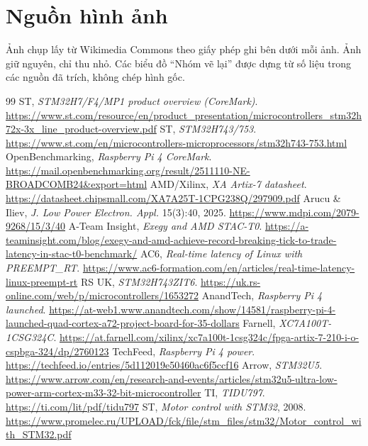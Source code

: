 \documentclass[11pt,a4paper]{article}
\begin{document}
\section*{Nguồn hình ảnh}
\small Ảnh chụp lấy từ Wikimedia Commons theo giấy phép ghi bên dưới mỗi ảnh. Ảnh giữ nguyên, chỉ thu nhỏ. Các biểu đồ ``Nhóm vẽ lại'' được dựng từ số liệu trong các nguồn đã trích, không chép hình gốc.
\begin{itemize}\footnotesize
\creditList
\end{itemize}

\begin{thebibliography}{99}\small
{} ST, \emph{STM32H7/F4/MP1 product overview (CoreMark)}. \url{https://www.st.com/resource/en/product_presentation/microcontrollers_stm32h72x-3x_line_product-overview.pdf}
 ST, \emph{STM32H743/753}. \url{https://www.st.com/en/microcontrollers-microprocessors/stm32h743-753.html}
 OpenBenchmarking, \emph{Raspberry Pi 4 CoreMark}. \url{https://mail.openbenchmarking.org/result/2511110-NE-BROADCOMB24&export=html}
 AMD/Xilinx, \emph{XA Artix-7 datasheet}. \url{https://datasheet.chipsmall.com/XA7A25T-1CPG238Q/297909.pdf}
 Arucu \& Iliev, \emph{J. Low Power Electron. Appl.} 15(3):40, 2025. \url{https://www.mdpi.com/2079-9268/15/3/40}
 A-Team Insight, \emph{Exegy and AMD STAC-T0}. \url{https://a-teaminsight.com/blog/exegy-and-amd-achieve-record-breaking-tick-to-trade-latency-in-stac-t0-benchmark/}
 AC6, \emph{Real-time latency of Linux with PREEMPT\_RT}. \url{https://www.ac6-formation.com/en/articles/real-time-latency-linux-preempt-rt}
 RS UK, \emph{STM32H743ZIT6}. \url{https://uk.rs-online.com/web/p/microcontrollers/1653272}
 AnandTech, \emph{Raspberry Pi 4 launched}. \url{https://at-web1.www.anandtech.com/show/14581/raspberry-pi-4-launched-quad-cortex-a72-project-board-for-35-dollars}
 Farnell, \emph{XC7A100T-1CSG324C}. \url{https://at.farnell.com/xilinx/xc7a100t-1csg324c/fpga-artix-7-210-i-o-cspbga-324/dp/2760123}
 TechFeed, \emph{Raspberry Pi 4 power}. \url{https://techfeed.io/entries/5d112019e50460ac6f5ccf16}
 Arrow, \emph{STM32U5}. \url{https://www.arrow.com/en/research-and-events/articles/stm32u5-ultra-low-power-arm-cortex-m33-32-bit-microcontroller}
 TI, \emph{TIDU797}. \url{https://ti.com/lit/pdf/tidu797}
 ST, \emph{Motor control with STM32}, 2008. \url{https://www.promelec.ru/UPLOAD/fck/file/stm_files/stm32/Motor_control_with_STM32.pdf}

\end{thebibliography}
\end{document}
